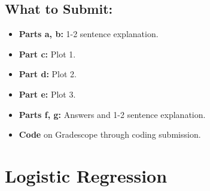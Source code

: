 \documentclass{article}
\begin{document}
\begin{aprob}
    \subsection*{What to Submit:}
    \begin{itemize}
        \item \textbf{Parts a, b:} 1-2 sentence explanation.
        \item \textbf{Part c:} Plot 1.
        \item \textbf{Part d:} Plot 2.
        \item \textbf{Part e:} Plot 3.
        \item \textbf{Parts f, g:} Answers and 1-2 sentence explanation.
        \item \textbf{Code} on Gradescope through coding submission.
    \end{itemize}
\end{aprob}

\section*{Logistic Regression}
\end{document}
